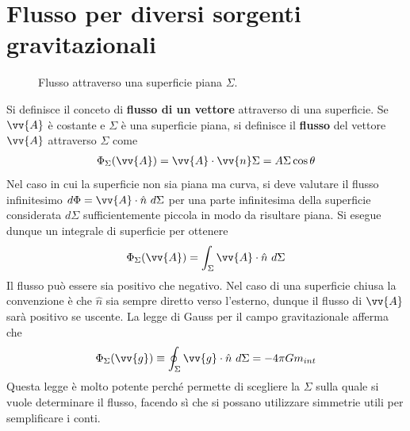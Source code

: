 \documentclass[a4paper, oneside]{book}
\begin{document}
\section{Flusso per diversi sorgenti gravitazionali}
\begin{figure}
    \centering
    \caption{Flusso attraverso una superficie piana $\Sigma$.}
\end{figure}
Si definisce il conceto di \textbf{flusso di un vettore} attraverso 
di una superficie. Se $\vv{A}$ è costante e $\Sigma$ è una superficie piana,
si definisce il \textbf{flusso} del vettore $\vv{A}$ attraverso $\Sigma$ come 
\begin{align}
    \Phi_\Sigma(\vv{A} ) = \vv{A} \cdot \vv{n} \Sigma = A\Sigma \cos\theta  
\end{align}  
Nel caso in cui la superficie non sia piana ma curva, si deve valutare il flusso 
infinitesimo $d\Phi = \vv{A} \cdot \hat{n} \ d\Sigma  $ per una parte infinitesima della superficie considerata
$d\Sigma$ sufficientemente piccola in modo da risultare piana. Si esegue dunque
un integrale di superficie per ottenere 
\begin{align}
    \Phi_\Sigma(\vv{A} ) = \int_{\Sigma} \vv{A} \cdot \hat{n} \ d\Sigma   
\end{align}
Il flusso può essere sia positivo che negativo. Nel caso di una superficie 
chiusa la convenzione è che $\hat{n}$ sia sempre diretto verso l'esterno, 
dunque il flusso di $\vv{A}$ sarà positivo se uscente. La legge di Gauss 
per il campo gravitazionale afferma che
\begin{align}
    \Phi_\Sigma(\vv{g} ) \equiv \oint_{\Sigma} \vv{g} \cdot \hat{n}\ d\Sigma = -4\pi G m_{int}   
\end{align}  
Questa legge è molto potente perché permette di scegliere la $\Sigma$ sulla 
quale si vuole determinare il flusso, facendo sì che si possano utilizzare 
simmetrie utili per semplificare i conti.
\end{document}
